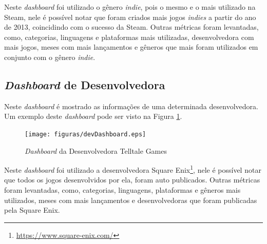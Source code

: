 Neste \textit{dashboard} foi utilizado o gênero \textit{indie}, pois o mesmo e o mais utilizado na Steam, nele é possível notar que foram criados mais jogos \textit{indies} a partir do ano de 2013, coincidindo com o sucesso da Steam. Outras métricas foram levantadas, como, categorias, linguagens e plataformas mais utilizadas, desenvolvedora com mais jogos, meses com mais lançamentos e gêneros que mais foram utilizados em conjunto com o gênero \textit{indie}.

\subsection*{\textit{Dashboard} de Desenvolvedora}
Neste \textit{dashboard} é mostrado as informações de uma determinada desenvolvedora. Um exemplo deste \textit{dashboard} pode ser visto na Figura \ref{image:devDash}.
\begin{figure} [H]
\centering
\texttt{[image: figuras/devDashboard.eps]}
\caption{\textit{Dashboard} da Desenvolvedora Telltale Games}
\label{image:devDash}
\end{figure}

Neste \textit{dashboard} foi utilizado a desenvolvedora Square Enix\footnote[2]{\url{https://www.square-enix.com/}}, nele é possível notar que todos os jogos desenvolvidos por ela, foram auto publicados. Outras métricas foram levantadas, como, categorias, linguagens, plataformas e gêneros mais utilizados, meses com mais lançamentos e desenvolvedoras que foram publicadas pela Square Enix.